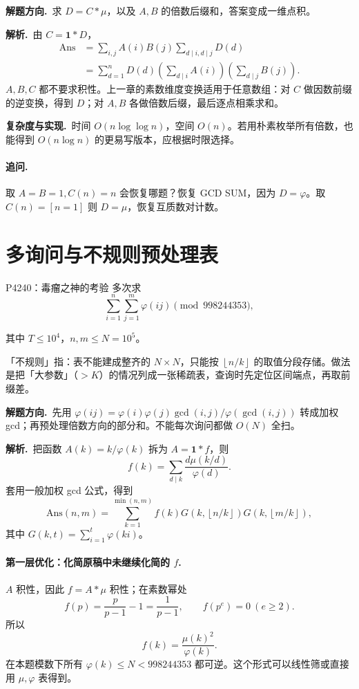 \documentclass[UTF8,a4paper,11pt,oneside,openany,fontset=fandol]{ctexbook}
\theoremstyle{definition}
\newcommand{\one}{\mathbf 1}
\newcommand{\floor}[1]{\left\lfloor #1\right\rfloor}
\newcommand{\sol}{\par\noindent\textbf{解析.}\ }
\newcommand{\hint}{\par\noindent\textbf{解题方向.}\ }
\newcommand{\cost}{\par\noindent\textbf{复杂度与实现.}\ }
\begin{document}
\hint 求 $D=C*\mu$，以及 $A,B$ 的倍数后缀和，答案变成一维点积。

\sol 由 $C=\one*D$，
\[
\begin{aligned}
\mathrm{Ans}
&=\sum_{i,j}A(i)B(j)\sum_{d\mid i,d\mid j}D(d)\\
&=\sum_{d=1}^nD(d)
 \left(\sum_{d\mid i}A(i)\right)
 \left(\sum_{d\mid j}B(j)\right).
\end{aligned}
\]
$A,B,C$ 都不要求积性。上一章的素数维度变换适用于任意数组：对 $C$ 做因数前缀的逆变换，得到 $D$；对 $A,B$ 各做倍数后缀，最后逐点相乘求和。
\cost 时间 $O(n\log\log n)$，空间 $O(n)$。若用朴素枚举所有倍数，也能得到 $O(n\log n)$ 的更易写版本，应根据时限选择。
\paragraph{追问.} 取 $A=B=1,C(n)=n$ 会恢复哪题？恢复 GCD SUM，因为 $D=\varphi$。取 $C(n)=[n=1]$ 则 $D=\mu$，恢复互质数对计数。


\section{多询问与不规则预处理表}
\begin{problem}{P4240：毒瘤之神的考验}
多次求
\[
 \sum_{i=1}^n\sum_{j=1}^m\varphi(ij)\pmod{998244353},
\]


其中 $T\le10^4$，$n,m\le N=10^5$。
\end{problem}

\begin{tip}
「不规则」指：表不能建成整齐的 $N\times N$，只能按 $\floor{n/k}$ 的取值分段存储。做法是把「大参数」（$>K$）的情况列成一张稀疏表，查询时先定位区间端点，再取前缀差。
\end{tip}

\hint 先用 $\varphi(ij)=\varphi(i)\varphi(j)\gcd(i,j)/\varphi(\gcd(i,j))$ 转成加权 gcd；再预处理倍数方向的部分和。不能每次询问都做 $O(N)$ 全扫。

\sol 把函数 $A(k)=k/\varphi(k)$ 拆为 $A=\one*f$，则
\[
 f(k)=\sum_{d\mid k}\frac{d\mu(k/d)}{\varphi(d)}.
\]
套用一般加权 gcd 公式，得到
\[
\boxed{\mathrm{Ans}(n,m)=\sum_{k=1}^{\min(n,m)}f(k)
G\left(k,\floor{n/k}\right)G\left(k,\floor{m/k}\right)},
\]
其中 $G(k,t)=\sum_{i=1}^t\varphi(ki)$。

\paragraph{第一层优化：化简原稿中未继续化简的 $f$.}
$A$ 积性，因此 $f=A*\mu$ 积性；在素数幂处
\[
 f(p)=\frac p{p-1}-1=\frac1{p-1},\qquad
 f(p^e)=0\ (e\ge2).
\]
所以
\[
 f(k)=\frac{\mu(k)^2}{\varphi(k)}.
\]
在本题模数下所有 $\varphi(k)\le N<998244353$ 都可逆。这个形式可以线性筛或直接用 $\mu,\varphi$ 表得到。
\end{document}
